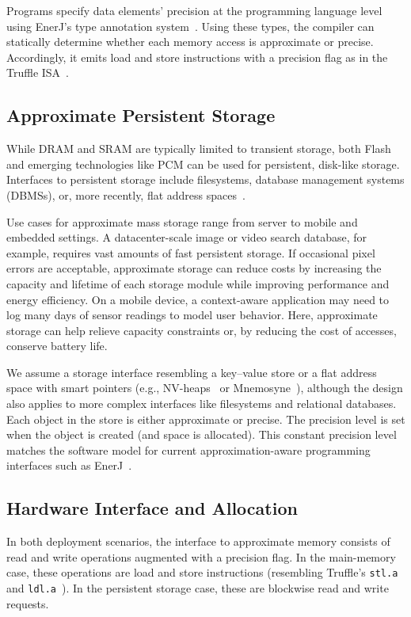 \documentclass[prodmode,acmtocs]{acmsmall}
\begin{document}
Programs specify data elements' precision at the programming language level using EnerJ's
type annotation system~\cite{enerj}.
Using these types, the compiler
can statically determine whether each memory access is approximate or
precise. Accordingly, it emits load and store instructions with a
precision flag as in the Truffle ISA~\cite{truffle}.

\subsection{Approximate Persistent Storage}

While DRAM and SRAM are typically limited to transient storage,
both Flash and emerging technologies like PCM can be used for
persistent, disk-like storage. 
Interfaces to persistent storage include
filesystems, database management systems (DBMSs),
or, more recently, flat address spaces~\cite{nvheaps,mnemosyne}.

Use cases
for approximate mass storage range from server to mobile and embedded
settings. A datacenter-scale image or video search database, for example,
requires vast amounts of fast persistent storage. If occasional
pixel errors are acceptable, approximate storage can reduce costs by
increasing the capacity and lifetime of each storage module while improving
performance and energy efficiency. On a mobile device, a
context-aware application may need to log many days of sensor readings to
model user behavior. Here, approximate storage can help relieve capacity
constraints or, by reducing the cost of accesses,
conserve battery life.

We assume a storage interface resembling a key--value store or a flat address
space with smart pointers (e.g., NV-heaps~\cite{nvheaps} or
Mnemosyne~\cite{mnemosyne}), although the design also applies to more
complex interfaces like filesystems and relational databases. Each
object in the store is either approximate or precise. The precision level is
set when the object is created (and space is allocated).
This constant precision level matches the software model for current
approximation-aware programming interfaces such as EnerJ~\cite{enerj}.

\subsection{Hardware Interface and Allocation}

In both deployment scenarios, the interface to approximate memory consists of read
and write operations augmented with a precision flag.
In the main-memory case, these operations are load and store instructions
(resembling Truffle's \verb+stl.a+ and \verb+ldl.a+~\cite{truffle}).
In the persistent storage case, these are blockwise read and write requests.
\end{document}
